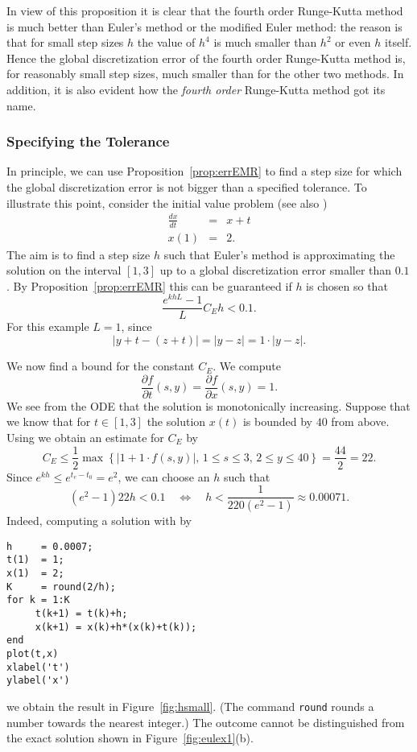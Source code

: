 \documentclass{ximera}
\begin{document}
In view of this proposition it is clear that the fourth order Runge-Kutta 
method is much better than Euler's method or the modified
Euler method: the reason is that for small step sizes $h$ the value of 
$h^4$ is much smaller than $h^2$ or even $h$ itself.  Hence the
global discretization error of the fourth order Runge-Kutta method is,
for reasonably small step sizes, much smaller than for the other two
methods.  In addition, it is also evident how the {\em fourth order\/} 
Runge-Kutta method got its name.

\subsubsection*{Specifying the Tolerance}

In principle, we can use Proposition~\ref{prop:errEMR} to find a step 
size for which the global discretization error is not bigger than a
specified tolerance.  To illustrate this point,  
consider the initial value problem (see also )
\begin{eqnarray*}
\frac{dx}{dt} & = & x+t \\
x(1) & = & 2.
\end{eqnarray*}
The aim is to find a step size $h$ such that Euler's method is
approximating the solution on the interval $[1,3]$ up to a global 
discretization error smaller than $0.1$.  By Proposition~\ref{prop:errEMR}
this can be guaranteed if $h$ is chosen so that
\[
\frac{e^{khL}-1}{L}C_E h < 0.1.
\]
For this example $L=1$, since
\[
|y+t-(z+t)|=|y-z|=1\cdot |y-z|.
\]

We now find a bound for the constant $C_E$.  We compute
\[
\frac{\partial f}{\partial t}(s,y)=\frac{\partial f}{\partial x}(s,y)=1.
\]
We see from the ODE that the solution is monotonically increasing.
Suppose that we know that for $t\in [1,3]$ the solution $x(t)$ is bounded
by $40$ from above.  Using  we obtain an estimate for $C_E$ by
\[
C_E\le \frac{1}{2}\max\left\{\vert 1+1\cdot f(s,y)\vert,\, 1\le s\le 3,\,
2 \le y \le 40 \right\}=\frac{44}{2}=22.
\]
Since $e^{kh}\le e^{t_e-t_0}=e^2$, we can choose an $h$ such that
\[
(e^2-1)22h < 0.1\quad \Longleftrightarrow 
\quad h<\frac{1}{220(e^2-1)}\approx 0.00071.
\]
Indeed, computing a solution with \Matlab by
\begin{verbatim}
h     = 0.0007;
t(1)  = 1;
x(1)  = 2;
K     = round(2/h);
for k = 1:K
     t(k+1) = t(k)+h;
     x(k+1) = x(k)+h*(x(k)+t(k));
end
plot(t,x)
xlabel('t')
ylabel('x')
\end{verbatim}
we obtain the result in Figure~\ref{fig:hsmall}.  (The \Matlab
command {\tt round} rounds a number towards the nearest integer.)
The outcome cannot be distinguished from the exact solution shown 
in Figure~\ref{fig:eulex1}(b).
\end{document}
